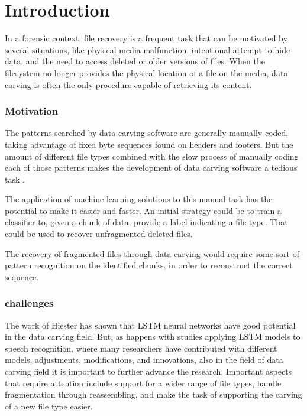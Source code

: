 \chapter{\label{chap:introduction}Introduction}

In a forensic context, file recovery is a frequent task that can be motivated by several situations, like physical media malfunction, intentional attempt to hide data, and the need to access deleted or older versions of files. When the filesystem no longer provides the physical location of a file on the media, data carving is often the only procedure capable of retrieving its content.

\subsection{Motivation}

The patterns searched by data carving software are generally manually coded, taking advantage of fixed byte sequences found on headers and footers. But the amount of different file types combined with the slow process of manually coding each of those patterns makes the development of data carving software a tedious task \cite{mcdaniel_content_2003}.

The application of machine learning solutions to this manual task has the potential to make it easier and faster. An initial strategy could be to train a classifier to, given a chunk of data, provide a label indicating a file type. That could be used to recover unfragmented deleted files.

The recovery of fragmented files through data carving would require some sort of pattern recognition on the identified chunks, in order to reconstruct the correct sequence.

\subsection{challenges}

The work of Hiester \cite{hiester_file_2018} has shown that LSTM neural networks have good potential in the data carving field. But, as happens with studies applying LSTM models to speech recognition, where many researchers have contributed with different models, adjustments, modifications, and innovations, also in the field of data carving field it is important to further advance the research. Important aspects that require attention include support for a wider range of file types, handle fragmentation through reassembling, and make the task of supporting the carving of a new file type easier.

